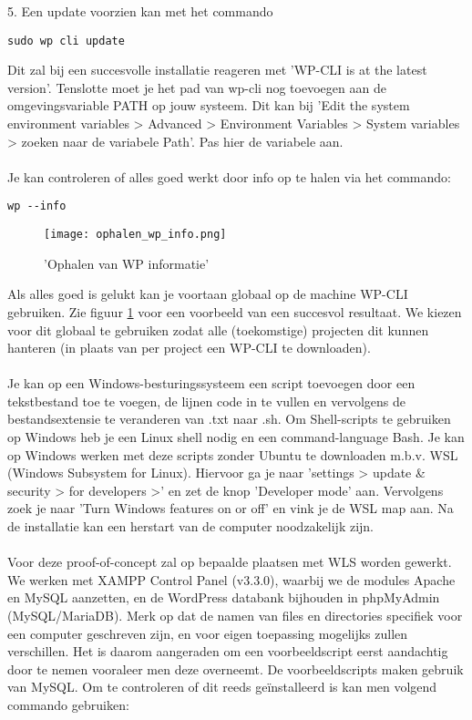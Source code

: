 5. Een update voorzien kan met het commando
\begin{verbatim}
sudo wp cli update
\end{verbatim}
Dit zal bij een succesvolle installatie reageren met 'WP-CLI is at the latest version'. Tenslotte moet je het pad van wp-cli nog toevoegen aan de omgevingsvariable PATH op jouw systeem. Dit kan bij 'Edit the system environment variables > Advanced > Environment Variables > System variables > zoeken naar de variabele Path'. Pas hier de variabele aan.
\\\\
Je kan controleren of alles goed werkt door info op te halen via het commando:\begin{verbatim}
wp --info
\end{verbatim}
\begin{figure}
    \caption{'Ophalen van WP informatie'}
    \label{ophalen_wp_info}
    \centering
    \texttt{[image: ophalen\_wp\_info.png]}
\end{figure}Als alles goed is gelukt kan je voortaan globaal op de machine WP-CLI gebruiken. Zie figuur \ref{ophalen_wp_info} voor een voorbeeld van een succesvol resultaat. We kiezen voor dit globaal te gebruiken zodat alle (toekomstige) projecten dit kunnen hanteren (in plaats van per project een WP-CLI te downloaden). 
\\\\
Je kan op een Windows-besturingssysteem een script toevoegen door een tekstbestand toe te voegen, de lijnen code in te vullen en vervolgens de bestandsextensie te veranderen van .txt naar .sh. Om Shell-scripts te gebruiken op Windows heb je een Linux shell nodig en een command-language Bash. Je kan op Windows werken met deze scripts zonder Ubuntu te downloaden m.b.v. WSL (Windows Subsystem for Linux). Hiervoor ga je naar 'settings > update \& security > for developers >' en zet de knop 'Developer mode' aan. Vervolgens zoek je naar 'Turn Windows features on or off' en vink je de WSL map aan. Na de installatie kan een herstart van de computer noodzakelijk zijn. 
\\\\
Voor deze proof-of-concept zal op bepaalde plaatsen met WLS worden gewerkt. We werken met XAMPP Control Panel (v3.3.0), waarbij we de modules Apache en MySQL aanzetten, en de WordPress databank bijhouden in phpMyAdmin (MySQL/MariaDB). Merk op dat de namen van files en directories specifiek voor een computer geschreven zijn, en voor eigen toepassing mogelijks zullen verschillen. Het is daarom aangeraden om een voorbeeldscript eerst aandachtig door te nemen vooraleer men deze overneemt. De voorbeeldscripts maken gebruik van MySQL. Om te controleren of dit reeds geïnstalleerd is kan men volgend commando gebruiken:
